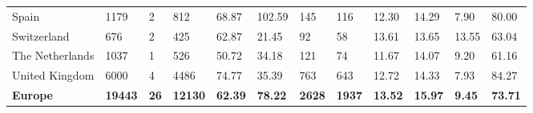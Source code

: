 \begin{tabular}{llllllllllll}
  Spain & 1179 & 2 & 812 & 68.87 & 102.59 & 145 & 116 & 12.30 & 14.29 & 7.90 & 80.00 \\ 
  Switzerland & 676 & 2 & 425 & 62.87 & 21.45 & 92 & 58 & 13.61 & 13.65 & 13.55 & 63.04 \\ 
  The Netherlands & 1037 & 1 & 526 & 50.72 & 34.18 & 121 & 74 & 11.67 & 14.07 & 9.20 & 61.16 \\ 
  United Kingdom & 6000 & 4 & 4486 & 74.77 & 35.39 & 763 & 643 & 12.72 & 14.33 & 7.93 & 84.27 \\ 
  \textbf{Europe} & \textbf{19443} & \textbf{26} & \textbf{12130} & \textbf{62.39} & \textbf{78.22} & \textbf{2628} & \textbf{1937} & \textbf{13.52} & \textbf{15.97} & \textbf{9.45} & \textbf{73.71} \\ 
   \bottomrule
\end{tabular}
